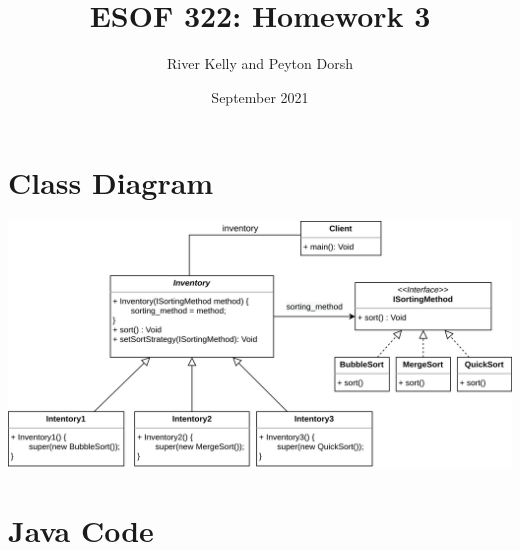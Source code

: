 \documentclass[12pt]{article}
\title{ESOF 322: Homework 3}
\author{River Kelly and Peyton Dorsh}
\date{September 2021}
\begin{document}
\maketitle
\newpage
\section*{Class Diagram}
\includegraphics[width=\linewidth]{Class-Diagram.png}
\newpage
\section*{Java Code}
\end{document}
